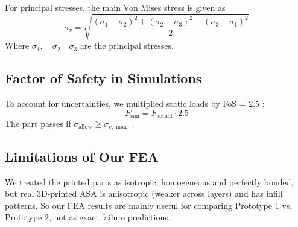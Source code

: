 For principal stresses, the main Von Mises stress is given as
\begin{equation}
    \sigma_v = \sqrt{\frac{(\sigma_1 - \sigma_2)^2 + (\sigma_2 - \sigma_3)^2 + (\sigma_3 - \sigma_1)^2}{2}}
\end{equation}
Where $\sigma_1, \quad \sigma_2 \quad \sigma_3$ are the principal stresses.

\subsection{Factor of Safety in Simulations}
To account for uncertainties, we multiplied static loads by FoS = 2.5 \cite{NASA_STD5001B}: 
\begin{equation}
    F_{\mathrm{sim}} = F_{\mathrm{actual}} \cdot 2.5
\end{equation}
The part passes if $\sigma_{\mathrm{allow}} \geq \sigma_{v,\max}$ \cite{solidworks_von_mises_2025}.

\subsection{Limitations of Our FEA}
We treated the printed parts as isotropic, homogeneous and perfectly bonded, but real 3D-printed ASA is anisotropic (weaker across layers) and has infill patterns. So our FEA results are mainly useful for comparing Prototype 1 vs. Prototype 2, not as exact failure predictions.